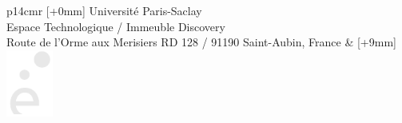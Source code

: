 \vspace{3cm} %
\selectfont
\begin{tabular}{p{14cm}r}
[+0mm]{{\color{Prune} Université Paris-Saclay\\
Espace Technologique / Immeuble Discovery\\
Route de l’Orme aux Merisiers RD 128 / 91190 Saint-Aubin, France}} & [+9mm]{\includegraphics[height=2.19cm]{Figs/e.pdf}}\\
\end{tabular}
